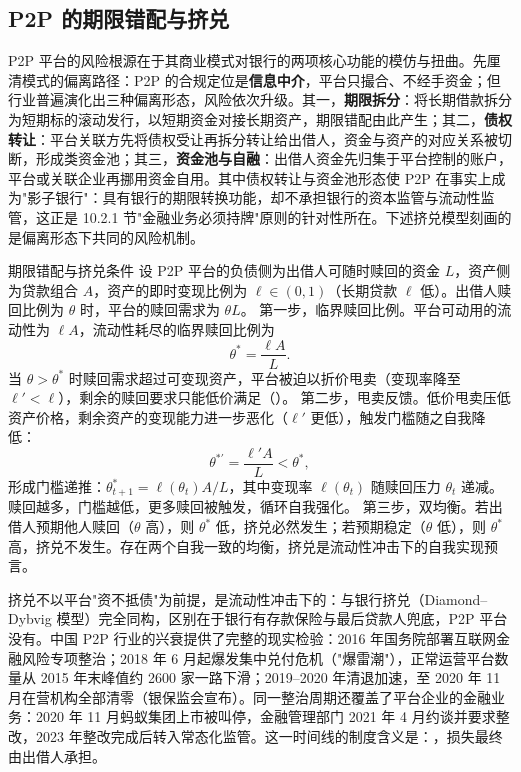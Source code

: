 \subsection{P2P 的期限错配与挤兑}

P2P 平台的风险根源在于其商业模式对银行的两项核心功能的模仿与扭曲。先厘清模式的偏离路径：P2P 的合规定位是\textbf{信息中介}，平台只撮合、不经手资金；但行业普遍演化出三种偏离形态，风险依次升级。其一，\textbf{期限拆分}：将长期借款拆分为短期标的滚动发行，以短期资金对接长期资产，期限错配由此产生；其二，\textbf{债权转让}：平台关联方先将债权受让再拆分转让给出借人，资金与资产的对应关系被切断，形成类资金池；其三，\textbf{资金池与自融}：出借人资金先归集于平台控制的账户，平台或关联企业再挪用资金自用。其中债权转让与资金池形态使 P2P 在事实上成为"影子银行"：具有银行的期限转换功能，却不承担银行的资本监管与流动性监管，这正是 10.2.1 节"金融业务必须持牌"原则的针对性所在。下述挤兑模型刻画的是偏离形态下共同的风险机制。

\begin{derivation}{期限错配与挤兑条件}{}
设 P2P 平台的负债侧为出借人可随时赎回的资金 $L$，资产侧为贷款组合 $A$，资产的即时变现比例为 $\ell \in (0,1)$（长期贷款 $\ell$ 低）。出借人赎回比例为 $\theta$ 时，平台的赎回需求为 $\theta L$。
第一步，临界赎回比例。平台可动用的流动性为 $\ell A$，流动性耗尽的临界赎回比例为
\[
\theta^* = \frac{\ell A}{L}.
\]
当 $\theta > \theta^*$ 时赎回需求超过可变现资产，平台被迫以折价甩卖（变现率降至 $\ell' < \ell$），剩余的赎回要求只能低价满足（）。
第二步，甩卖反馈。低价甩卖压低资产价格，剩余资产的变现能力进一步恶化（$\ell'$ 更低），触发门槛随之自我降低：
\[
\theta^{*\prime} = \frac{\ell' A}{L} < \theta^*,
\]
形成门槛递推：$\theta^*_{t+1} = \ell(\theta_t) A / L$，其中变现率 $\ell(\theta_t)$ 随赎回压力 $\theta_t$ 递减。赎回越多，门槛越低，更多赎回被触发，循环自我强化。
第三步，双均衡。若出借人预期他人赎回（$\theta$ 高），则 $\theta^*$ 低，挤兑必然发生；若预期稳定（$\theta$ 低），则 $\theta^*$ 高，挤兑不发生。存在两个自我一致的均衡，挤兑是流动性冲击下的自我实现预言。
\end{derivation}

挤兑不以平台"资不抵债"为前提，是流动性冲击下的：与银行挤兑（Diamond--Dybvig 模型）完全同构，区别在于银行有存款保险与最后贷款人兜底，P2P 平台没有。中国 P2P 行业的兴衰提供了完整的现实检验：2016 年国务院部署互联网金融风险专项整治；2018 年 6 月起爆发集中兑付危机（"爆雷潮"），正常运营平台数量从 2015 年末峰值约 2600 家一路下滑；2019--2020 年清退加速，至 2020 年 11 月在营机构全部清零（银保监会宣布）。同一整治周期还覆盖了平台企业的金融业务：2020 年 11 月蚂蚁集团上市被叫停，金融管理部门 2021 年 4 月约谈并要求整改，2023 年整改完成后转入常态化监管。这一时间线的制度含义是：，损失最终由出借人承担。

